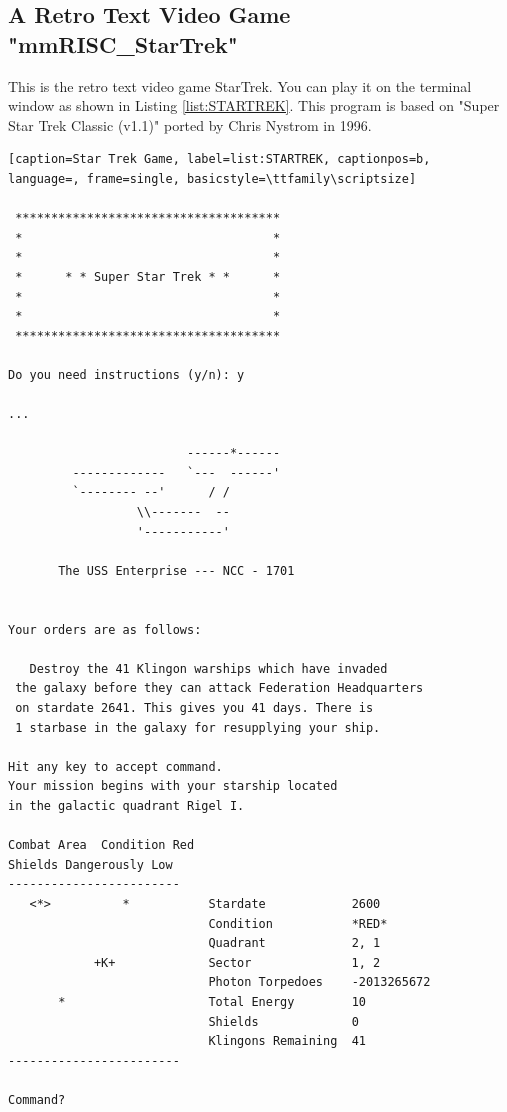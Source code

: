 \subsection{A Retro Text Video Game "mmRISC\_StarTrek"}
This is the retro text video game StarTrek. You can play it on the terminal window as shown in Listing \ref{list:STARTREK}. This program is based on "Super Star Trek Classic (v1.1)" ported by Chris Nystrom in 1996.

\begin{lstlisting}[caption=Star Trek Game, label=list:STARTREK, captionpos=b,  language=, frame=single, basicstyle=\ttfamily\scriptsize]

 *************************************
 *                                   *
 *                                   *
 *      * * Super Star Trek * *      *
 *                                   *
 *                                   *
 *************************************

Do you need instructions (y/n): y

...

                         ------*------
         -------------   `---  ------'
         `-------- --'      / /
                  \\-------  --
                  '-----------'

       The USS Enterprise --- NCC - 1701


Your orders are as follows:

   Destroy the 41 Klingon warships which have invaded
 the galaxy before they can attack Federation Headquarters
 on stardate 2641. This gives you 41 days. There is
 1 starbase in the galaxy for resupplying your ship.

Hit any key to accept command. 
Your mission begins with your starship located
in the galactic quadrant Rigel I.

Combat Area  Condition Red
Shields Dangerously Low
------------------------
   <*>          *           Stardate            2600
                            Condition           *RED*
                            Quadrant            2, 1
            +K+             Sector              1, 2
                            Photon Torpedoes    -2013265672
       *                    Total Energy        10
                            Shields             0
                            Klingons Remaining  41
------------------------

Command? 
\end{lstlisting}

